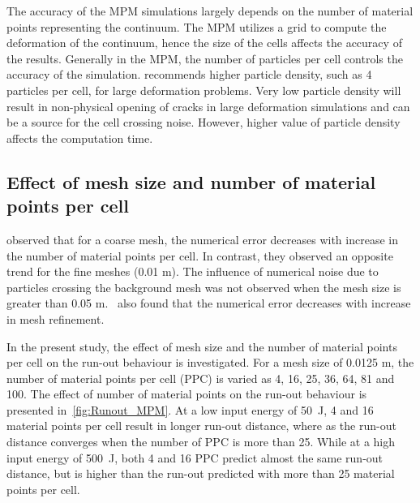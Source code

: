 The accuracy of the MPM simulations largely depends on the number of material 
points representing the continuum. The MPM utilizes a grid to compute the 
deformation of the continuum, hence the size of the cells affects the accuracy 
of the results. Generally in the MPM, the number of particles per cell controls 
the accuracy of the simulation. \citet{Guilkey2003} recommends higher particle 
density, such as 4 particles per cell, for large deformation problems. Very low 
particle density will result in non-physical opening of cracks in large 
deformation simulations and can be a source for the cell crossing noise. 
However, higher value of particle density affects the computation time. 

\subsection{Effect of mesh size and number of material points per cell}
\label{sec:MPM_points_per_cell}

\citet{Abe2013} observed that for a coarse mesh, the numerical error 
decreases with increase in the number of material points per cell. In contrast, 
they observed an opposite trend for the fine meshes (0.01 \si{\m}). The 
influence of numerical noise due to particles crossing the background mesh was 
not observed when the mesh size is greater than 0.05 
\si{\m}.~\citet{Coetzee2005} also found that the numerical error decreases with 
increase in mesh refinement.

In the present study, the effect of mesh size and the number of material points 
per cell on the run-out behaviour is investigated. For a mesh size of 0.0125 
\si{\m}, the number of material points per cell (PPC) is varied as 4, 16, 25, 
36, 64, 81 and 100. The effect of number of material points on the run-out 
behaviour is presented in~\cref{fig:Runout_MPM}. At a low input energy of 
50~\si{\J}, 4 and 16 material points per cell result in longer run-out 
distance, where as the 
run-out distance converges when the number of PPC is more 
than 25. While at a high input energy of 500~\si{J}, both 4 and 16 PPC predict 
almost the same run-out distance, but is higher than the run-out predicted 
with more than 25 material points per cell. 

